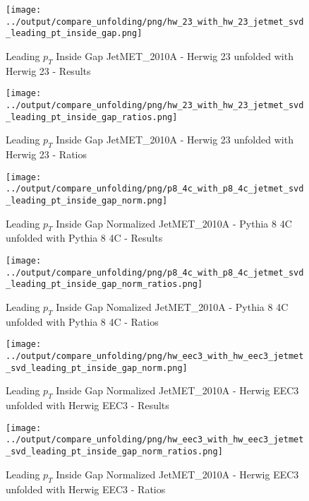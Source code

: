 \documentclass[11pt]{book}
\begin{document}
\begin{figure}[ht]
\centering
\texttt{[image: ../output/compare\_unfolding/png/hw\_23\_with\_hw\_23\_jetmet\_svd\_leading\_pt\_inside\_gap.png]}
\caption{Leading $p_{T}$ Inside Gap JetMET\_2010A - Herwig 23 unfolded with Herwig 23 - Results}
\label{hw_23_hw_23_jetmet_svd_leading_pt_inside_gap_a}
\end{figure}

\begin{figure}[ht]
\centering
\texttt{[image: ../output/compare\_unfolding/png/hw\_23\_with\_hw\_23\_jetmet\_svd\_leading\_pt\_inside\_gap\_ratios.png]}
\caption{Leading $p_{T}$ Inside Gap JetMET\_2010A - Herwig 23 unfolded with Herwig 23 - Ratios}
\label{hw_23_hw_23_jetmet_svd_leading_pt_inside_gap_b}
\end{figure}



\begin{figure}[ht]
\centering
\texttt{[image: ../output/compare\_unfolding/png/p8\_4c\_with\_p8\_4c\_jetmet\_svd\_leading\_pt\_inside\_gap\_norm.png]}
\caption{Leading $p_{T}$ Inside Gap Normalized JetMET\_2010A - Pythia 8 4C unfolded with Pythia 8 4C - Results}
\label{p8_p8_jetmet_svd_leading_pt_inside_gap_norm_a}
\end{figure}

\begin{figure}[ht]
\centering
\texttt{[image: ../output/compare\_unfolding/png/p8\_4c\_with\_p8\_4c\_jetmet\_svd\_leading\_pt\_inside\_gap\_norm\_ratios.png]}
\caption{Leading $p_{T}$ Inside Gap Nomalized JetMET\_2010A - Pythia 8 4C unfolded with Pythia 8 4C - Ratios}
\label{p8_p8_jetmet_svd_leading_pt_inside_gap_norm_b}
\end{figure}

\begin{figure}[ht]
\centering
\texttt{[image: ../output/compare\_unfolding/png/hw\_eec3\_with\_hw\_eec3\_jetmet\_svd\_leading\_pt\_inside\_gap\_norm.png]}
\caption{Leading $p_{T}$ Inside Gap Normalized JetMET\_2010A - Herwig EEC3 unfolded with Herwig EEC3 - Results}
\label{hw_eec3_hw_eec3_jetmet_svd_leading_pt_inside_gap_norm_a}
\end{figure}

\begin{figure}[ht]
\centering
\texttt{[image: ../output/compare\_unfolding/png/hw\_eec3\_with\_hw\_eec3\_jetmet\_svd\_leading\_pt\_inside\_gap\_norm\_ratios.png]}
\caption{Leading $p_{T}$ Inside Gap Normalized JetMET\_2010A - Herwig EEC3 unfolded with Herwig EEC3 - Ratios}
\label{hw_eec3_hw_eec3_jetmet_svd_leading_pt_inside_gap_norm_b}
\end{figure}
\end{document}
